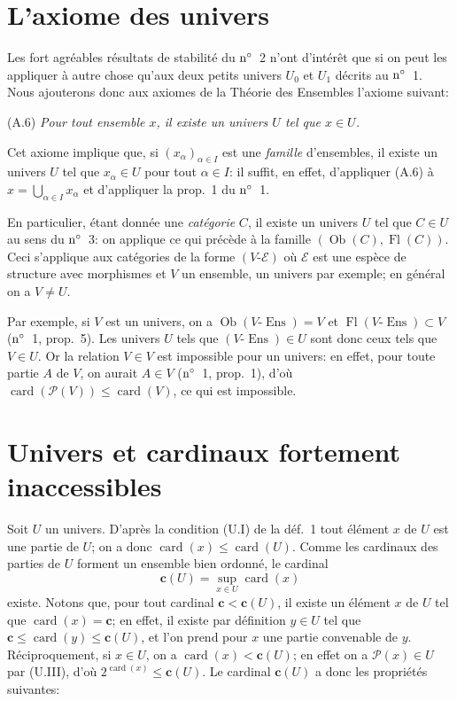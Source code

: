 \documentclass[12pt]{article}
\newcommand{\card}{\operatorname{card}}
\newcommand{\Ob}{\operatorname{Ob}}
\newcommand{\Ens}{\operatorname{Ens}}
\newcommand{\Fl}{\operatorname{Fl}}
\begin{document}
\section{L'axiome des univers}

Les fort agréables résultats de stabilité du $\rm n^\circ$~2 n'ont d'intérêt que si on peut les appliquer à autre chose qu'aux deux petits univers $U_0$ et $U_1$ décrits au ${\rm n^\circ}$~1. Nous ajouterons donc aux axiomes de la Théorie des Ensembles l'axiome suivant:

(A.6) \emph{Pour tout ensemble $x$, il existe un univers $U$ tel que $x\in U$.}

Cet axiome implique que, si $(x_{\alpha})_{\alpha\in I}$ est une \emph{famille} d'ensembles, il existe un univers $U$ tel que $x_{\alpha}\in U$ pour tout $\alpha\in I$: il suffit, en effet, d'appliquer (A.6) à $x=\bigcup_{\alpha\in I}x_{\alpha}$ et d'appliquer la prop.~1 du $\rm n^\circ$~1.

En particulier, étant donnée une \emph{catégorie} $C$, il existe un univers $U$ tel que $C\in U$ au sens du $\rm n^\circ$~3: on applique ce qui précède à la famille $(\Ob(C),\Fl(C))$. Ceci s'applique aux catégories de la forme $(V\text{-}\mathcal{E})$ où $\mathcal{E}$ est une espèce de structure avec morphismes et $V$ un ensemble, un univers par exemple; en général on a $V\neq U$.

Par exemple, si $V$ est un univers, on a $\Ob(V\text{-}\Ens)=V$ et $\Fl(V\text{-}\Ens)\subset V$ ($\rm n^\circ$~1, prop.~5). Les univers $U$ tels que $(V\text{-}\Ens)\in U$ sont donc ceux tels que $V\in U$. Or la relation $V\in V$ est impossible pour un univers: en effet, pour toute partie $A$ de $V$, on aurait $A\in V$ ($\rm n^\circ$~1, prop.~1), d'où $\card(\mathcal{P}(V))\leq\card(V)$, ce qui est impossible.

\section{Univers et cardinaux fortement inaccessibles}

Soit $U$ un univers. D'après la condition (U.I) de la déf.~1 tout élément $x$ de $U$ est une partie de $U$; on a donc $\card(x)\leq\card(U)$. Comme les cardinaux des parties de $U$ forment un ensemble bien ordonné, le cardinal
\begin{equation*}
\mathbf c(U)={\sup}_{x\in U}\card(x)\tag{1}
\end{equation*}
existe. Notons que, pour tout cardinal $\mathbf c < \mathbf c(U)$, il existe un élément $x$ de $U$ tel que $\card(x)=\mathbf c$; en effet, il existe par définition $y\in U$ tel que $\mathbf c\leq \card(y)\leq\mathbf c(U)$, et l'on prend pour $x$ une partie convenable de $y$. Réciproquement, si $x\in U$, on a $\card(x) < \mathbf c(U)$; en effet on a $\mathcal{P}(x)\in U$ par (U.III), d'où $2^{\card(x)}\leq\mathbf c(U)$. Le cardinal $\mathbf c(U)$ a donc les propriétés suivantes:
\end{document}
